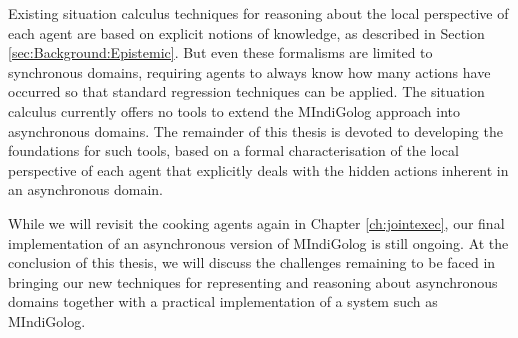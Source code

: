 Existing situation calculus techniques for reasoning about the local
perspective of each agent are based on explicit notions of knowledge,
as described in Section \ref{sec:Background:Epistemic}. But even
these formalisms are limited to synchronous domains, requiring agents
to always know how many actions have occurred so that standard regression
techniques can be applied. The situation calculus currently offers
no tools to extend the MIndiGolog approach into asynchronous domains.
The remainder of this thesis is devoted to developing the foundations
for such tools, based on a formal characterisation of the local perspective
of each agent that explicitly deals with the hidden actions inherent
in an asynchronous domain.

While we will revisit the cooking agents again in Chapter \ref{ch:jointexec},
our final implementation of an asynchronous version of MIndiGolog
is still ongoing. At the conclusion of this thesis, we will discuss
the challenges remaining to be faced in bringing our new techniques
for representing and reasoning about asynchronous domains together
with a practical implementation of a system such as MIndiGolog.

